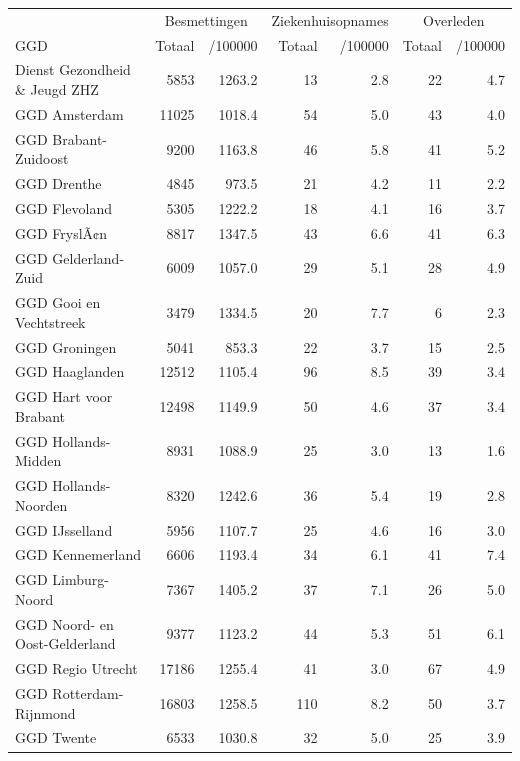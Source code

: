 \documentclass[
  english,
  man,floatsintext]{apa6}
\begin{document}
\begin{table}
\centering\begingroup\fontsize{10}{12}\selectfont

\begin{threeparttable}
\begin{tabular}{lrrrrrr}
\toprule
\multicolumn{1}{c}{ } & \multicolumn{2}{c}{Besmettingen} & \multicolumn{2}{c}{Ziekenhuisopnames} & \multicolumn{2}{c}{Overleden} \\
\cmidrule(l{3pt}r{3pt}){2-3} \cmidrule(l{3pt}r{3pt}){4-5} \cmidrule(l{3pt}r{3pt}){6-7}
GGD & Totaal & /100000 & Totaal & /100000 & Totaal & /100000\\
\midrule
Dienst Gezondheid \& Jeugd ZHZ & 5853 & 1263.2 & 13 & 2.8 & 22 & 4.7\\
GGD Amsterdam & 11025 & 1018.4 & 54 & 5.0 & 43 & 4.0\\
GGD Brabant-Zuidoost & 9200 & 1163.8 & 46 & 5.8 & 41 & 5.2\\
GGD Drenthe & 4845 & 973.5 & 21 & 4.2 & 11 & 2.2\\
GGD Flevoland & 5305 & 1222.2 & 18 & 4.1 & 16 & 3.7\\
GGD FryslÃ¢n & 8817 & 1347.5 & 43 & 6.6 & 41 & 6.3\\
GGD Gelderland-Zuid & 6009 & 1057.0 & 29 & 5.1 & 28 & 4.9\\
GGD Gooi en Vechtstreek & 3479 & 1334.5 & 20 & 7.7 & 6 & 2.3\\
GGD Groningen & 5041 & 853.3 & 22 & 3.7 & 15 & 2.5\\
GGD Haaglanden & 12512 & 1105.4 & 96 & 8.5 & 39 & 3.4\\
GGD Hart voor Brabant & 12498 & 1149.9 & 50 & 4.6 & 37 & 3.4\\
GGD Hollands-Midden & 8931 & 1088.9 & 25 & 3.0 & 13 & 1.6\\
GGD Hollands-Noorden & 8320 & 1242.6 & 36 & 5.4 & 19 & 2.8\\
GGD IJsselland & 5956 & 1107.7 & 25 & 4.6 & 16 & 3.0\\
GGD Kennemerland & 6606 & 1193.4 & 34 & 6.1 & 41 & 7.4\\
GGD Limburg-Noord & 7367 & 1405.2 & 37 & 7.1 & 26 & 5.0\\
GGD Noord- en Oost-Gelderland & 9377 & 1123.2 & 44 & 5.3 & 51 & 6.1\\
GGD Regio Utrecht & 17186 & 1255.4 & 41 & 3.0 & 67 & 4.9\\
GGD Rotterdam-Rijnmond & 16803 & 1258.5 & 110 & 8.2 & 50 & 3.7\\
GGD Twente & 6533 & 1030.8 & 32 & 5.0 & 25 & 3.9\\

\end{tabular}
\end{threeparttable}
\end{table}
\end{document}
